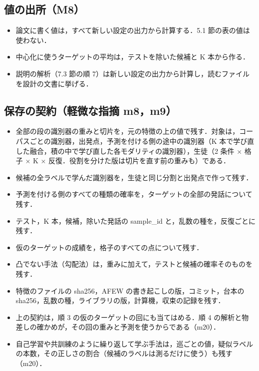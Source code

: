 \documentclass[11pt,a4paper]{ltjsarticle}
\begin{document}
\subsection{値の出所（M8）}

\begin{itemize}
  \item 論文に書く値は，すべて新しい設定の出力から計算する．5.1 節の表の値は使わない．
  \item 中心化に使うターゲットの平均は，テストを除いた候補と K 本から作る．
  \item 説明の解析（7.3 節の順 7）は新しい設定の出力から計算し，読むファイルを設計の文書に挙げる．
\end{itemize}

\subsection{保存の契約（軽微な指摘 m8，m9）}

\begin{itemize}
  \item 全部の段の識別器の重みと切片を，元の特徴の上の値で残す．対象は，コーパスごとの識別器，出発点，予測を付ける側の途中の識別器（K 本で学び直した融合，積の中で学び直した各モダリティの識別器），生徒（2 条件 × 格子 × K × 反復．役割を分けた版は切片を直す前の重みも）である．
  \item 候補の全ラベルで学んだ識別器を，生徒と同じ分割と出発点で作って残す．
  \item 予測を付ける側のすべての種類の確率を，ターゲットの全部の発話について残す．
  \item テスト，K 本，候補，除いた発話の sample\_id と，乱数の種を，反復ごとに残す．
  \item 仮のターゲットの成績を，格子のすべての点について残す．
  \item 凸でない手法（勾配法）は，重みに加えて，テストと候補の確率そのものを残す．
  \item 特徴のファイルの sha256，AFEW の書き起こしの版，コミット，台本の sha256，乱数の種，ライブラリの版，計算機，収束の記録を残す．
  \item 上の契約は，順 3 の仮のターゲットの回にも当てはめる．順 4 の解析と物差しの確かめが，その回の重みと予測を使うからである（m20）．
  \item 自己学習や共訓練のように繰り返して学ぶ手法は，巡ごとの値，疑似ラベルの本数，その正しさの割合（候補のラベルは測るだけに使う）も残す（m20）．
\end{itemize}
\end{document}
